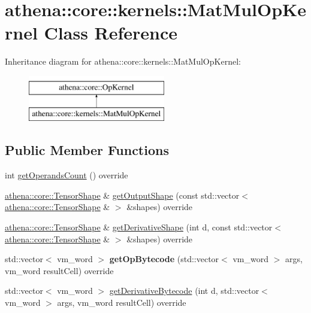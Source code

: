 \hypertarget{classathena_1_1core_1_1kernels_1_1_mat_mul_op_kernel}{}\section{athena\+:\+:core\+:\+:kernels\+:\+:Mat\+Mul\+Op\+Kernel Class Reference}
\label{classathena_1_1core_1_1kernels_1_1_mat_mul_op_kernel}
Inheritance diagram for athena\+:\+:core\+:\+:kernels\+:\+:Mat\+Mul\+Op\+Kernel\+:\begin{figure}[H]
\begin{center}
\leavevmode
\includegraphics[height=2.000000cm]{classathena_1_1core_1_1kernels_1_1_mat_mul_op_kernel}
\end{center}
\end{figure}
\subsection*{Public Member Functions}
\begin{DoxyCompactItemize}
\item 
int \mbox{\hyperlink{classathena_1_1core_1_1kernels_1_1_mat_mul_op_kernel_a75f9e43d1fcecaf9260af31c68cd69db}{get\+Operands\+Count}} () override
\item 
\mbox{\hyperlink{classathena_1_1core_1_1_tensor_shape}{athena\+::core\+::\+Tensor\+Shape}} \& \mbox{\hyperlink{classathena_1_1core_1_1kernels_1_1_mat_mul_op_kernel_a6bfb45669c7ebb74c32f8846a940c57a}{get\+Output\+Shape}} (const std\+::vector$<$ \mbox{\hyperlink{classathena_1_1core_1_1_tensor_shape}{athena\+::core\+::\+Tensor\+Shape}} \& $>$ \&shapes) override
\item 
\mbox{\hyperlink{classathena_1_1core_1_1_tensor_shape}{athena\+::core\+::\+Tensor\+Shape}} \& \mbox{\hyperlink{classathena_1_1core_1_1kernels_1_1_mat_mul_op_kernel_aaf7aa2db812b58dedda8ed43d3ea994f}{get\+Derivative\+Shape}} (int d, const std\+::vector$<$ \mbox{\hyperlink{classathena_1_1core_1_1_tensor_shape}{athena\+::core\+::\+Tensor\+Shape}} \& $>$ \&shapes) override
\item 
\mbox{\label{classathena_1_1core_1_1kernels_1_1_mat_mul_op_kernel_ac6dc778bb5313e5c567410fd5f217351}} 
std\+::vector$<$ vm\+\_\+word $>$ {\bfseries get\+Op\+Bytecode} (std\+::vector$<$ vm\+\_\+word $>$ args, vm\+\_\+word result\+Cell) override
\item 
std\+::vector$<$ vm\+\_\+word $>$ \mbox{\hyperlink{classathena_1_1core_1_1kernels_1_1_mat_mul_op_kernel_a42d08b8004e8033e01988eb2392215c8}{get\+Derivative\+Bytecode}} (int d, std\+::vector$<$ vm\+\_\+word $>$ args, vm\+\_\+word result\+Cell) override
\end{DoxyCompactItemize}
